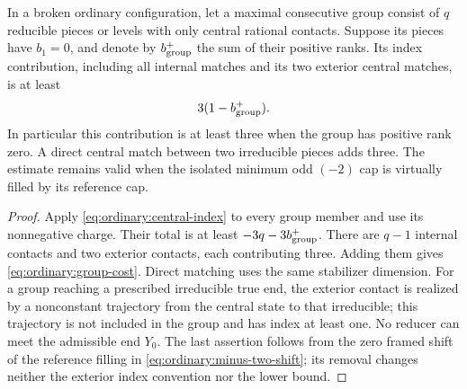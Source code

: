 \begin{lemma}
\label{lem:ordinary:central-cost}
In a broken ordinary configuration, let a maximal consecutive group
consist of $q$ reducible pieces or levels with only central rational
contacts.  Suppose its pieces have $b_1=0$, and denote by
$b^+_{\rm group}$ the sum of their positive ranks.  Its index
contribution, including all internal matches and its two exterior
central matches, is at least
\begin{equation}\label{eq:ordinary:group-cost}
 3(1-b^+_{\rm group}).
\end{equation}
In particular this contribution is at least three when the group
has positive rank zero.  A direct central match between two
irreducible pieces adds three.  The estimate remains valid when
the isolated minimum odd $(-2)$ cap is virtually filled by its
reference cap.
\end{lemma}
\begin{proof}
Apply \eqref{eq:ordinary:central-index} to every group member
and use its nonnegative charge.  Their total is at least
$-3q-3b^+_{\rm group}$.  There are $q-1$ internal contacts
and two exterior contacts, each contributing three.  Adding
them gives \eqref{eq:ordinary:group-cost}.  Direct matching
uses the same stabilizer dimension.  For a group reaching a
prescribed irreducible true end, the exterior contact is
realized by a nonconstant trajectory from the central state
to that irreducible; this trajectory is not included in the
group and has index at least one.  No reducer can meet the
admissible end $Y_0$.  The last assertion follows from the
zero framed shift of the reference filling in
\eqref{eq:ordinary:minus-two-shift}; its removal changes
neither the exterior index convention nor the lower bound.
\end{proof}

